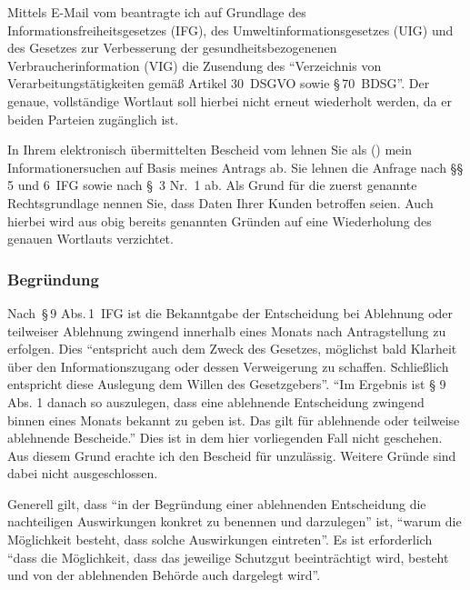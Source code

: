 \documentclass[
paper=a4,
parskip=full,
twoside
]{scrartcl}
\newcommand{\textsharpNew}{\#} %
\begin{document}
{\begin{letter}{%
			}
			Mittels E-Mail vom \requestDate{} beantragte ich auf Grundlage des Informationsfreiheitsgesetzes (IFG), des Umweltinformationsgesetzes (UIG) und des Gesetzes zur Verbesserung der gesundheitsbezogenenen Verbraucherinformation (VIG) die Zusendung des
			\enquote{Verzeichnis von Verarbeitungstätigkeiten gemäß Artikel 30~DSGVO sowie §\,70~BDSG}.
			Der genaue, vollständige Wortlaut soll hierbei nicht erneut wiederholt werden, da er beiden Parteien zugänglich ist.

			In Ihrem
			elektronisch übermittelten
			Bescheid vom
			\requestNoticeDate{}
			lehnen Sie als  ()
			mein Informationersuchen auf Basis meines Antrags
			ab.
			Sie lehnen die Anfrage nach §§\,5 und 6~IFG sowie nach §~3 Nr.~1 ab.
			Als Grund für die zuerst genannte Rechtsgrundlage nennen Sie, dass Daten Ihrer Kunden betroffen seien.
			Auch hierbei wird aus obig bereits genannten Gründen auf eine Wiederholung des genauen Wortlauts verzichtet.


			\subsubsection*{Begründung} \vspace{-10pt}
			Nach~§\,9 Abs.\,1~IFG ist die Bekanntgabe der Entscheidung bei Ablehnung oder teilweiser Ablehnung zwingend innerhalb eines Monats nach Antragstellung zu erfolgen. Dies \enquote{entspricht auch dem Zweck des Gesetzes, möglichst bald Klarheit über den Informationszugang oder dessen Verweigerung zu schaffen. Schließlich entspricht diese Auslegung dem Willen des Gesetzgebers}.
			\enquote{Im Ergebnis ist § 9 Abs. 1 danach so auszulegen,
				dass eine ablehnende Entscheidung \textelp{} zwingend
				binnen eines Monats bekannt zu geben ist. Das
				gilt für ablehnende oder teilweise ablehnende
				Bescheide.}
			Dies ist in dem hier vorliegenden Fall nicht geschehen. Aus diesem Grund erachte ich den Bescheid für unzulässig. Weitere Gründe sind dabei nicht ausgeschlossen.


			Generell gilt, dass
			\enquote{in der Begründung einer ablehnenden Entscheidung \textelp{} die nachteiligen Auswirkungen konkret zu benennen und \textendash darzulegen} ist,
			\enquote{warum die Möglichkeit besteht, dass solche  Auswirkungen  eintreten}.
			Es ist erforderlich \enquote{dass die Möglichkeit, dass das jeweilige Schutzgut beeinträchtigt wird, besteht und von der ablehnenden Behörde auch dargelegt wird}.


\end{letter}}
\end{document}
